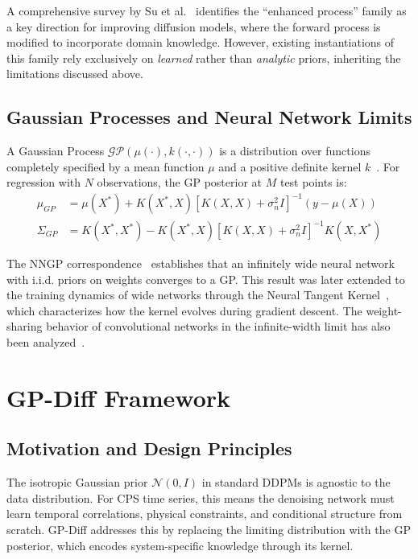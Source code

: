 \documentclass[conference]{IEEEtran}
\begin{document}
A comprehensive survey by Su et al.~\cite{Su2025Survey} identifies the ``enhanced process'' family as a key direction for improving diffusion models, where the forward process is modified to incorporate domain knowledge. However, existing instantiations of this family rely exclusively on \textit{learned} rather than \textit{analytic} priors, inheriting the limitations discussed above.

\subsection{Gaussian Processes and Neural Network Limits}

A Gaussian Process $\mathcal{GP}(\mu(\cdot), k(\cdot, \cdot))$ is a distribution over functions completely specified by a mean function $\mu$ and a positive definite kernel $k$~\cite{Rasmussen2006GP}. For regression with $N$ observations, the GP posterior at $M$ test points is:
\begin{align}
\mu_{GP} &= \mu(X^*) + K(X^*, X)[K(X, X) + \sigma_n^2 I]^{-1}(y - \mu(X)) \label{eq:gp_mean}\\
\Sigma_{GP} &= K(X^*, X^*) - K(X^*, X)[K(X, X) + \sigma_n^2 I]^{-1}K(X, X^*) \label{eq:gp_cov}
\end{align}

The NNGP correspondence~\cite{Neal1996Priors, Lee2018NNGP} establishes that an infinitely wide neural network with i.i.d. priors on weights converges to a GP. This result was later extended to the training dynamics of wide networks through the Neural Tangent Kernel~\cite{Jacot2018NTK}, which characterizes how the kernel evolves during gradient descent. The weight-sharing behavior of convolutional networks in the infinite-width limit has also been analyzed~\cite{Xiao2019WeightShare}.

\section{GP-Diff Framework}

\subsection{Motivation and Design Principles}

The isotropic Gaussian prior $\mathcal{N}(0, I)$ in standard DDPMs is agnostic to the data distribution. For CPS time series, this means the denoising network must learn temporal correlations, physical constraints, and conditional structure from scratch. GP-Diff addresses this by replacing the limiting distribution with the GP posterior, which encodes system-specific knowledge through its kernel.
\end{document}

